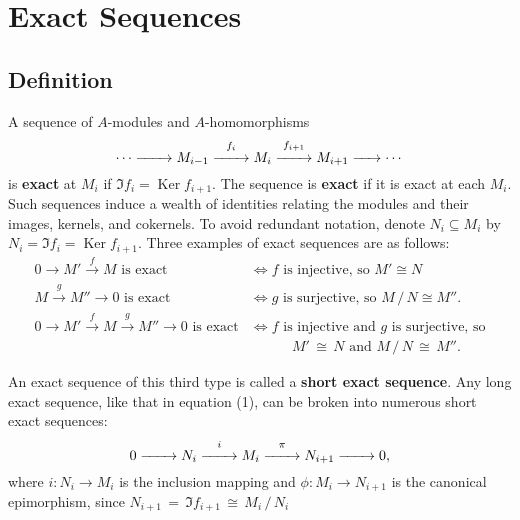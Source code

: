 \documentclass[11pt]{article}
\newcommand{\Ker}{\operatorname{Ker}}
\renewcommand{\longrightarrow}{\xrightarrow{\hspace*{0.7cm}}}
\begin{document}
\newpage


\section{Exact Sequences}


\subsection{Definition}

A sequence of $A$-modules and $A$-homomorphisms
\begin{equation}
	\cdots \longrightarrow M_{i - 1} \stackrel{f_{i}}{\longrightarrow} M_{i} \stackrel{f_{i + 1}}{\longrightarrow} M_{i + 1} \xrightarrow{\hspace*{0.5cm}} \cdots 
\end{equation}
is \textbf{exact} at $M_{i}$ if $\Im f_{i} = \Ker f_{i + 1}$. The sequence is \textbf{exact} if it is exact at each $M_{i}$. Such sequences induce a wealth of identities relating the modules and their images, kernels, and cokernels. To avoid redundant notation, denote $N_{i} \subseteq M_{i}$ by $N_{i} = \Im f_{i} = \Ker f_{i + 1}$. Three examples of exact sequences are as follows:
\begin{align*}
	0 \to M' \stackrel{f}{\to} M \text{ is exact } &\iff \text{$f$ is injective, so $M' \cong N$} \\
	M \stackrel{g}{\to} M'' \to 0 \text{ is exact } &\iff \text{$g$ is surjective, so $M \,/\, N \cong M''$.} \\
	0 \to M' \stackrel{f}{\to} M \stackrel{g}{\to} M'' \to 0 \text{ is exact} &\iff \text{$f$ is injective and $g$ is surjective, so} \\
	& \quad \qquad \text{$M' \, \cong \, N$ and $M \, / \, N \, \cong \, M''$}.
\end{align*}

An exact sequence of this third type is called a \textbf{short exact sequence}. Any long exact sequence, like that in equation (1), can be broken into numerous short exact sequences:
\[
	0 \longrightarrow N_{i} \stackrel{i}{\longrightarrow} M_{i} \stackrel{\pi}{\longrightarrow} N_{i + 1} \longrightarrow 0,
\]
where $i : N_{i} \to M_{i}$ is the inclusion mapping and $\phi : M_{i} \to N_{i + 1}$ is the canonical epimorphism, since $N_{i + 1} \, = \, \Im f_{i + 1} \, \cong \, M_{i} \, / \, N_{i}$
\end{document}
